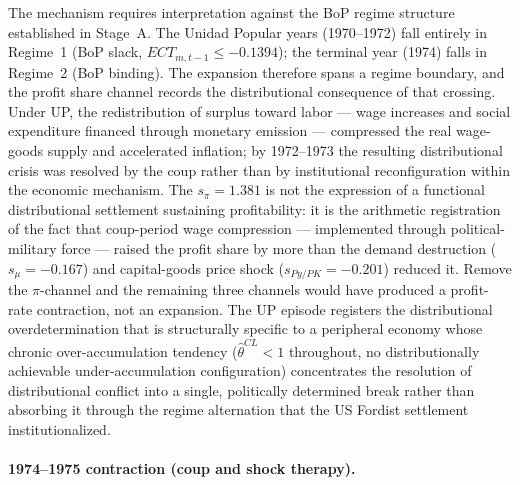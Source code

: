 \documentclass[11pt,a4paper]{article}
\begin{document}
{The mechanism requires interpretation against the BoP regime structure
established in Stage~A. The Unidad Popular years (1970--1972) fall entirely
in Regime~1 (BoP slack, $ECT_{m,t-1} \leq -0.1394$); the terminal year
(1974) falls in Regime~2 (BoP binding). The expansion therefore spans a
regime boundary, and the profit share channel records the distributional
consequence of that crossing. Under UP, the redistribution of surplus
toward labor --- wage increases and social expenditure financed through
monetary emission --- compressed the real wage-goods supply and accelerated
inflation; by 1972--1973 the resulting distributional crisis was resolved
by the coup rather than by institutional reconfiguration within the economic
mechanism. The $s_\pi = 1.381$ is not the expression of a functional
distributional settlement sustaining profitability: it is the arithmetic
registration of the fact that coup-period wage compression --- implemented
through political-military force --- raised the profit share by more than
the demand destruction ($s_\mu = -0.167$) and capital-goods price shock
($s_{Py/PK} = -0.201$) reduced it. Remove the $\pi$-channel and the
remaining three channels would have produced a profit-rate contraction, not
an expansion. The UP episode registers the distributional overdetermination
that is structurally specific to a peripheral economy whose chronic
over-accumulation tendency ($\hat{\theta}^{CL} < 1$ throughout, no
distributionally achievable under-accumulation configuration) concentrates
the resolution of distributional conflict into a single, politically
determined break rather than absorbing it through the regime alternation
that the US Fordist settlement institutionalized.

\paragraph{1974--1975 contraction (coup and shock therapy).}

}
\end{document}
